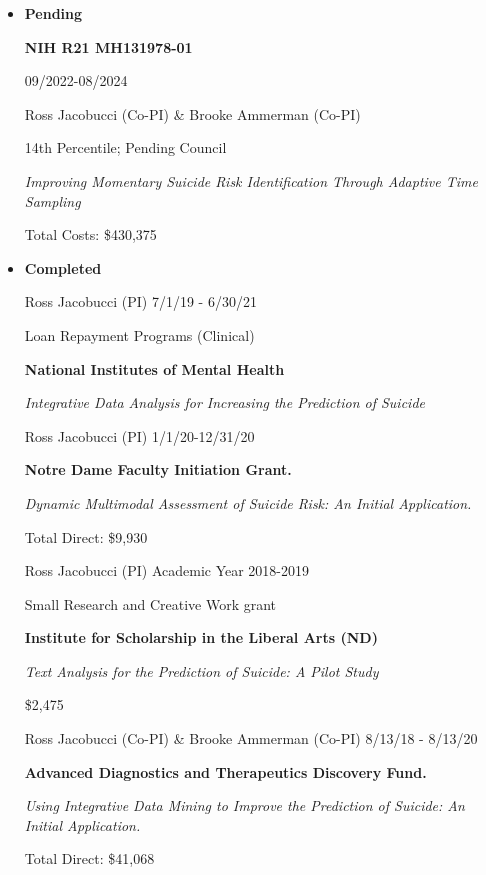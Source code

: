 \documentclass[letterpaper,10pt]{article}
\begin{document}
\begin{itemize}
	\item {\textbf{\large{Pending}}}



\begin{center}
		\noindent\parbox{0.7\textwidth}{\raggedright \textbf{NIH R21 MH131978-01}}\hfill%
	\parbox{0.2\textwidth}{\raggedright 09/2022-08/2024}
	\parbox{6.5in}{{Ross Jacobucci (Co-PI) \& Brooke Ammerman (Co-PI)}  }
	\parbox{6.5in} {14th Percentile; Pending Council}
	\parbox{6.5in}{\textit{Improving Momentary Suicide Risk Identification Through Adaptive Time Sampling}}
	\parbox{6.5in}{Total Costs: \$430,375}
\end{center}

	\item{\textbf{\large{Completed}}}
	
		\begin{center}
		\parbox{6.5in}{{Ross Jacobucci (PI) }   \hspace{9cm} 7/1/19 - 6/30/21}
		\parbox{6.5in}{Loan Repayment Programs (Clinical)}
		\parbox{6.5in}{\textbf{National Institutes of Mental Health} }
		\parbox{6.5in}{\textit{Integrative Data Analysis for Increasing the Prediction of Suicide}}
	\end{center}
	
		\begin{center}
		\parbox{6.5in}{{Ross Jacobucci (PI)}   \hspace{9.2cm} 1/1/20-12/31/20}
		\parbox{6.5in}{\textbf{Notre Dame Faculty Initiation Grant.} }
		\parbox{6.5in}{\textit{Dynamic Multimodal Assessment of Suicide Risk: An Initial Application.}}
		\parbox{6.5in}{Total Direct: \$9,930}
	\end{center}
	
		\begin{center}
		\parbox{6.5in}{{Ross Jacobucci (PI) }   \hspace{9cm} Academic Year 2018-2019}
		\parbox{6.5in}{Small Research and Creative Work grant}
		\parbox{6.5in}{\textbf{Institute for Scholarship in the Liberal Arts (ND)} }
		\parbox{6.5in}{\textit{Text Analysis for the Prediction of Suicide: A Pilot Study}}
		\parbox{6.5in}{\$2,475}
	\end{center}
	
	\begin{center}
		\parbox{6.5in}{{Ross Jacobucci (Co-PI) \& Brooke Ammerman (Co-PI)}   \hspace{3.8cm} 8/13/18 - 8/13/20}
		\parbox{6.5in}{\textbf{Advanced Diagnostics and Therapeutics Discovery Fund.} }
		\parbox{6.5in}{\textit{Using Integrative Data Mining to Improve the Prediction of Suicide: An Initial Application.}}
		\parbox{6.5in}{Total Direct: \$41,068}
	\end{center}

	
\end{itemize}
\end{document}
